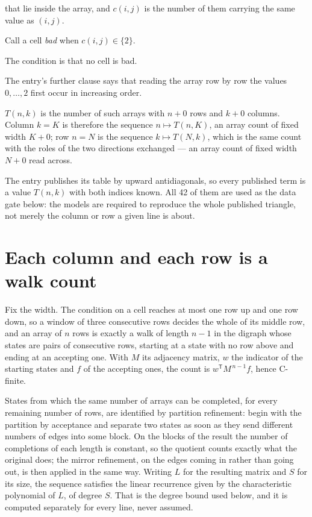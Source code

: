 \documentclass[11pt]{article}
\theoremstyle{definition}
\begin{document}
that lie inside the array, and $c(i,j)$ is the number of them carrying the same value as $(i,j)$.

Call a cell {\itshape bad} when $c(i,j) \in \{2\}$.

The condition is that no cell is bad.

The entry's further clause says that reading the array row by row the values $0,\dots,2$ first occur in increasing order.

$T(n,k)$ is the number of such arrays with $n + 0$ rows and $k + 0$ columns. Column $k = K$ is therefore the sequence $n \mapsto T(n,K)$, an array count of fixed width $K + 0$; row $n = N$ is the sequence $k \mapsto T(N,k)$, which is the same count with the roles of the two directions exchanged --- an array count of fixed width $N + 0$ read across.

The entry publishes its table by upward antidiagonals, so every published term is a value $T(n,k)$ with both indices known. All 42 of them are used as the data gate below: the models are required to reproduce the whole published triangle, not merely the column or row a given line is about.

\section{Each column and each row is a walk count}

Fix the width. The condition on a cell reaches at most one row up and one row down, so a window of three consecutive rows decides the whole of its middle row, and an array of $n$ rows is exactly a walk of length $n-1$ in the digraph whose states are pairs of consecutive rows, starting at a state with no row above and ending at an accepting one. With $M$ its adjacency matrix, $w$ the indicator of the starting states and $f$ of the accepting ones, the count is $w^{\mathsf T}M^{\,n-1}f$, hence C-finite.

States from which the same number of arrays can be completed, for every remaining number of rows, are identified by partition refinement: begin with the partition by acceptance and separate two states as soon as they send different numbers of edges into some block. On the blocks of the result the number of completions of each length is constant, so the quotient counts exactly what the original does; the mirror refinement, on the edges coming in rather than going out, is then applied in the same way. Writing $L$ for the resulting matrix and $S$ for its size, the sequence satisfies the linear recurrence given by the characteristic polynomial of $L$, of degree $S$. That is the degree bound used below, and it is computed separately for every line, never assumed.
\end{document}

